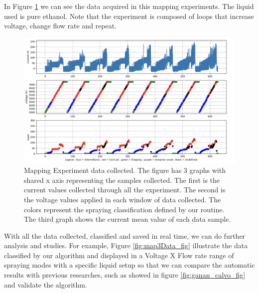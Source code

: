    In Figure \ref{fig:map2Data_fig} we can see the data acquired in this mapping experiments. The liquid used is pure ethanol. 
    Note that the experiment is composed of loops that increase voltage, change flow rate and repeat.

    \begin{figure}[H]
        \center
        \includegraphics[width=15cm]{Figuras/report2/map2Data.png}
        \caption{Mapping Experiment data collected. The figure has 3 graphs with shared x axis representing the samples collected. The first is the current values collected through all the experiment.
        The second is the voltage values applied in each window of data collected. The colors represent the spraying classification defined by our routine.
        The third graph shows the current mean value of each data sample.}
        \label{fig:map2Data_fig}
    \end{figure}

    With all the data collected, classified and saved in real time, we can do further analysis and studies. For example, Figure \ref{fig:map3Data_fig} illustrate the data classified by our algorithm and displayed in a Voltage X Flow rate range of spraying modes with a specific liquid setup so that we can compare the automatic results with previous researches, such as showed in figure \ref{fig:ganan_calvo_fig} and validate the algorithm.


